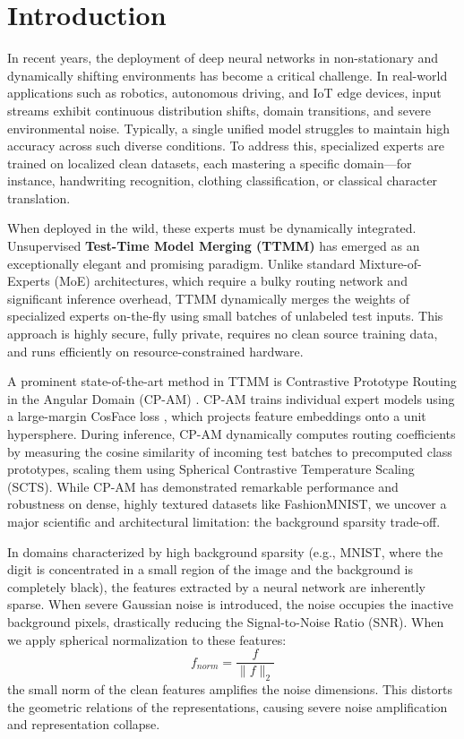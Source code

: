\documentclass{article}
\theoremstyle{plain}
\theoremstyle{definition}
\theoremstyle{remark}
\begin{document}
\section{Introduction}
\label{intro}
In recent years, the deployment of deep neural networks in non-stationary and dynamically shifting environments has become a critical challenge. In real-world applications such as robotics, autonomous driving, and IoT edge devices, input streams exhibit continuous distribution shifts, domain transitions, and severe environmental noise. Typically, a single unified model struggles to maintain high accuracy across such diverse conditions. To address this, specialized experts are trained on localized clean datasets, each mastering a specific domain—for instance, handwriting recognition, clothing classification, or classical character translation.

When deployed in the wild, these experts must be dynamically integrated. Unsupervised \textbf{Test-Time Model Merging (TTMM)} \cite{cpam2026, fdfdpa2026, bkcomerge2026} has emerged as an exceptionally elegant and promising paradigm. Unlike standard Mixture-of-Experts (MoE) architectures, which require a bulky routing network and significant inference overhead, TTMM dynamically merges the weights of specialized experts on-the-fly using small batches of unlabeled test inputs. This approach is highly secure, fully private, requires no clean source training data, and runs efficiently on resource-constrained hardware.

A prominent state-of-the-art method in TTMM is Contrastive Prototype Routing in the Angular Domain (CP-AM) \cite{cpam2026}. CP-AM trains individual expert models using a large-margin CosFace loss \cite{wang2018cosface}, which projects feature embeddings onto a unit hypersphere. During inference, CP-AM dynamically computes routing coefficients by measuring the cosine similarity of incoming test batches to precomputed class prototypes, scaling them using Spherical Contrastive Temperature Scaling (SCTS). While CP-AM has demonstrated remarkable performance and robustness on dense, highly textured datasets like FashionMNIST, we uncover a major scientific and architectural limitation: the background sparsity trade-off.

In domains characterized by high background sparsity (e.g., MNIST, where the digit is concentrated in a small region of the image and the background is completely black), the features extracted by a neural network are inherently sparse. When severe Gaussian noise is introduced, the noise occupies the inactive background pixels, drastically reducing the Signal-to-Noise Ratio (SNR). When we apply spherical normalization to these features:
\begin{equation}
    f_{norm} = \frac{f}{\|f\|_2}
\end{equation}
the small norm of the clean features amplifies the noise dimensions. This distorts the geometric relations of the representations, causing severe noise amplification and representation collapse.
\end{document}
